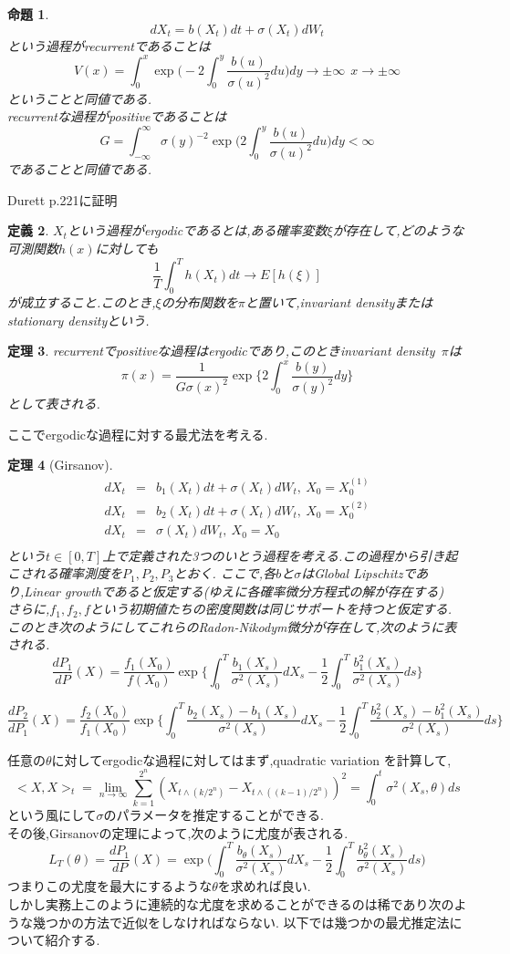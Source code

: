 \documentclass[a4paper,dvipdfmx]{jreport}
\numberwithin{equation}{section}
\newtheorem{Thm}     {定理}[section]
\newtheorem{Def}     [Thm]{定義}
\newtheorem{Prop}    [Thm]{命題}
\renewenvironment{leftbar}{%
  \def\FrameCommand{\vrule width 1pt \hspace{10pt}}%
  \MakeFramed {\advance\hsize-\width \FrameRestore}}%
 {\endMakeFramed}
\def\thm{\begin{leftbar}\begin{Thm}}
\def\thmx{\end{Thm}\end{leftbar}}
\def\prop{\begin{Prop}}
\def\propx{\end{Prop}}
\def\defb{\begin{leftbar}\begin{Def}}
\def\defx{\end{Def}\end{leftbar}}
\def\eqa{\begin{eqnarray}}
\def\eqax{\end{eqnarray}}
\begin{document}
\prop
\[
dX_t = b (X_t) dt + \sigma (X_t) dW_t
\]
という過程がrecurrentであることは
\[
V(x) = \int_{0}^x \exp \biggl( -2 \int_{0}^y \frac{b(u)}{\sigma(u)^2} du \biggl) dy   \to \pm\infty \ \ x\to \pm\infty
\]
ということと同値である.\\
recurrentな過程がpositiveであることは
\[
G= \int_{-\infty}^\infty \sigma(y)^{-2} \exp \biggl( 2 \int_{0}^y \frac{b(u)}{\sigma(u)^2} du \biggl) dy  < \infty
\]
であることと同値である.
\propx
Durett p.221に証明
\defb
$X_t$という過程がergodicであるとは,ある確率変数$\xi$が存在して,どのような可測関数$h(x)$に対しても
\[
\frac{1}{T} \int_0^T h(X_t) dt  \to E[h(\xi)]
\]
が成立すること.このとき,$\xi$の分布関数を$\pi$と置いて,invariant densityまたはstationary densityという.
\defx

\thm
recurrentでpositiveな過程はergodicであり,このときinvariant density\ $\pi$は
\[
\pi(x) = \frac{1}{G\sigma(x)^2} 
	\exp 
	\biggl\{ 
		2 \int_0^x \frac{b(y)}{\sigma(y)^2}dy 
	\biggl\}
\]
として表される.
\thmx
ここでergodicな過程に対する最尤法を考える.

\thm[Girsanov]
\eqa
dX_t &=& b_1(X_t) dt + \sigma(X_t) dW_t ,\ X_0 = X_0^{(1)} \\
dX_t &=& b_2(X_t) dt + \sigma(X_t) dW_t ,\ X_0 = X_0^{(2)} \\
dX_t &=& \sigma(X_t) dW_t ,\ X_0 = X_0\\
\eqax
という$t\in [0,T]$上で定義された3つのいとう過程を考える.この過程から引き起こされる確率測度を$P_1,P_2,P_3$とおく.
ここで,各$b$と$\sigma$はGlobal Lipschitzであり,Linear growthであると仮定する(ゆえに各確率微分方程式の解が存在する)\\
さらに,$f_1,f_2,f$という初期値たちの密度関数は同じサポートを持つと仮定する.\\
このとき次のようにしてこれらのRadon-Nikodym微分が存在して,次のように表される.
\[
\frac{dP_1}{dP}(X) = \frac{f_1(X_0)}{f(X_0)} 
\exp \biggl\{
	\int_0^T \frac{b_1(X_s)}{\sigma^2(X_s)} dX_s - 
	\frac{1}{2} \int_0^T \frac{ b_1^2(X_s) }{\sigma^2(X_s)} ds
	 \biggl\}
\]

\[
\frac{dP_2}{dP_1}(X) = \frac{f_2(X_0)}{f_1(X_0)} 
\exp \biggl\{
	\int_0^T \frac{b_2(X_s)-b_1(X_s)}{\sigma^2(X_s)} dX_s - 
	\frac{1}{2} \int_0^T \frac{b_2^2(X_s)- b_1^2(X_s) }{\sigma^2(X_s)} ds
	 \biggl\}
\]
	 

\thmx
任意の$\theta$に対してergodicな過程に対してはまず,quadratic variation を計算して,
\[
<X,X>_t = \lim_{n\to\infty} \sum_{k=1}^{2^n} (X_{t\wedge (k/2^n)} - X_{t\wedge ((k-1)/2^n)})^2 =
\int_0^t \sigma^2(X_s,\theta)ds 
\]
という風にして$\sigma$のパラメータを推定することができる.\\
その後,Girsanovの定理によって,次のように尤度が表される.
\[
L_T(\theta) = \frac{dP_1}{dP}(X)  
	= \exp \biggl( \int_0^T \frac{b_\theta(X_s)}{\sigma^2(X_s)} dX_s - 
	\frac{1}{2} \int_0^T \frac{ b_\theta^2(X_s) }{\sigma^2(X_s)} ds
	 \biggl)
\]
つまりこの尤度を最大にするような$\theta$を求めれば良い.\\
しかし実務上このように連続的な尤度を求めることができるのは稀であり次のような幾つかの方法で近似をしなければならない.
以下では幾つかの最尤推定法について紹介する.
\end{document}
